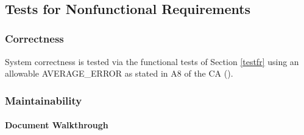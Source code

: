 \documentclass[12pt, titlepage]{article}
\begin{document}
~\newpage

\subsection{Tests for Nonfunctional Requirements}
\label{nfrtest}

\subsubsection{Correctness}

System correctness is tested via the functional tests of Section \ref{testfr} using an allowable AVERAGE\_ERROR as stated in A8 of the CA (\citet{LBM_CA_PM}).

\subsubsection{Maintainability}
		
\paragraph{Document Walkthrough}
\end{document}
